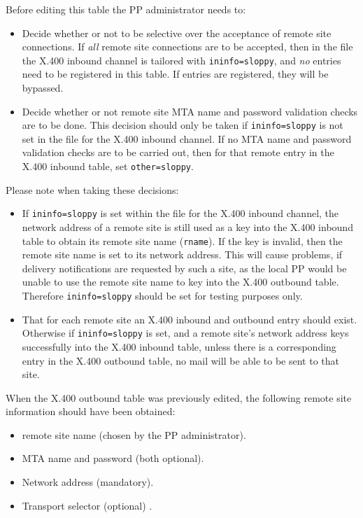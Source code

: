 Before editing this table the PP administrator needs to:
\begin {itemize}
\item Decide whether or not to be selective over the acceptance 
of remote site connections. If {\em all} remote site connections are 
to be accepted, then in the  file the X.400 inbound
channel is tailored with \verb|ininfo=sloppy|, and {\em no} entries 
need to be registered in this table. If entries are registered, 
they will be bypassed. 

\item Decide whether or not remote site MTA name and password 
validation checks are to be done. This decision should only 
be taken if \verb|ininfo=sloppy| is not set in the  file
for the X.400 inbound channel. If no MTA name and password 
validation checks are to be carried out, then for that remote entry 
in the X.400 inbound table, set \verb|other=sloppy|. 
\end {itemize}

Please note when taking these decisions:  
\begin{itemize}
\item If \verb|ininfo=sloppy| is set within the  file for the 
X.400 inbound channel, the network address of a remote site 
is still used as a key into the X.400 inbound table to obtain its 
remote site name (\verb|rname|).
If the key is invalid, then the remote site name is set to its 
network address. 
This will cause problems, if delivery notifications are requested 
by such a site, as the local PP would be unable to use 
the remote site name to key into the X.400 outbound table. 
Therefore \verb|ininfo=sloppy| should be set for testing purposes only.

\item That for each remote site an X.400 inbound and outbound entry 
should exist.
Otherwise if \verb|ininfo=sloppy| is set,
and a remote site's network address keys successfully into the 
X.400 inbound table, unless there 
is a corresponding entry in the X.400 outbound table, no mail 
will be able to be sent to that site.
\end{itemize}
 
When the X.400 outbound table was previously edited, the following 
remote site information should have been obtained: 

\begin{itemize}
\item remote site name (chosen by the PP administrator).
\item MTA name and password (both optional).
\item Network address (mandatory).
\item Transport selector (optional) .
\end{itemize}

